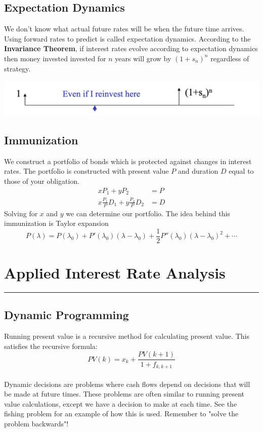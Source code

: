 \documentclass[11pt]{article}
\begin{document}
\subsection{Expectation Dynamics}
We don't know what actual future rates will be when the future time arrives. Using forward rates to predict is called expectation dynamics.  According to the \textbf{Invariance Theorem}, if interest rates evolve according to expectation dynamics then money invested invested for $n$ years will grow by $(1+s_n)^n$ regardless of strategy.
\begin{center}
\includegraphics[scale=0.6]{images/invariance.png} 
\end{center}
\subsection{Immunization}
We construct a portfolio of bonds which is protected against changes in interest rates.  The portfolio is constructed with present value $P$ and duration $D$ equal to those of your obligation. 
\begin{align*}
xP_1 + yP_2 &= P \\
x \frac{P_1}{P} D_1 + y \frac{P_2}{P} D_2 &= D 
\end{align*}
Solving for $x$ and $y$ we can determine our portfolio. The idea behind this immunization is Taylor expansion
$$ P(\lambda) = P(\lambda_0) + P'(\lambda_0) (\lambda - \lambda_0) + \frac{1}{2} P'' (\lambda_0) (\lambda - \lambda_0)^2 + \cdots $$
\pagebreak

\section{Applied Interest Rate Analysis}
\hrule \vspace{15pt}

\subsection{Dynamic Programming}
Running present value is a recursive method for calculating present value.  This satisfies the recursive formula: \\  $$ PV(k) = x_k + \frac{PV(k+1)}{1+f_{k,k+1}}$$ \\
Dynamic decisions are problems where cash flows depend on decisions that will be made at future times. These problems are often similar to running present value calculations, except we have a decision to make at each time.  See the fishing problem for an example of how this is used.  Remember to "solve the problem backwards"!
\end{document}
